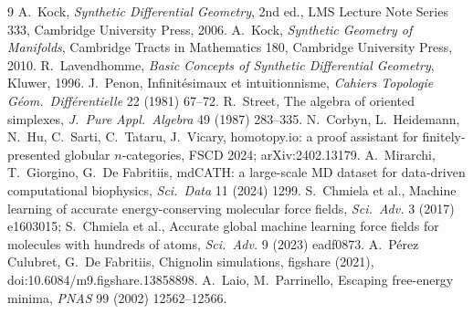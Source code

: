 \documentclass[11pt]{article}
\begin{document}
\begin{thebibliography}{9}
 A.~Kock, \emph{Synthetic Differential Geometry}, 2nd ed., LMS Lecture Note Series 333, Cambridge University Press, 2006.
 A.~Kock, \emph{Synthetic Geometry of Manifolds}, Cambridge Tracts in Mathematics 180, Cambridge University Press, 2010.
 R.~Lavendhomme, \emph{Basic Concepts of Synthetic Differential Geometry}, Kluwer, 1996.
 J.~Penon, Infinit\'esimaux et intuitionnisme, \emph{Cahiers Topologie G\'eom.\ Diff\'erentielle} 22 (1981) 67--72.
 R.~Street, The algebra of oriented simplexes, \emph{J.\ Pure Appl.\ Algebra} 49 (1987) 283--335.
 N.~Corbyn, L.~Heidemann, N.~Hu, C.~Sarti, C.~Tataru, J.~Vicary, homotopy.io: a proof assistant for finitely-presented globular $n$-categories, FSCD 2024; arXiv:2402.13179.
 A.~Mirarchi, T.~Giorgino, G.~De Fabritiis, mdCATH: a large-scale MD dataset for data-driven computational biophysics, \emph{Sci.\ Data} 11 (2024) 1299.
 S.~Chmiela et al., Machine learning of accurate energy-conserving molecular force fields, \emph{Sci.\ Adv.} 3 (2017) e1603015; S.~Chmiela et al., Accurate global machine learning force fields for molecules with hundreds of atoms, \emph{Sci.\ Adv.} 9 (2023) eadf0873.
 A.~P\'erez Culubret, G.~De Fabritiis, Chignolin simulations, figshare (2021), doi:10.6084/m9.figshare.13858898.
 A.~Laio, M.~Parrinello, Escaping free-energy minima, \emph{PNAS} 99 (2002) 12562--12566.
\end{thebibliography}
\end{document}
